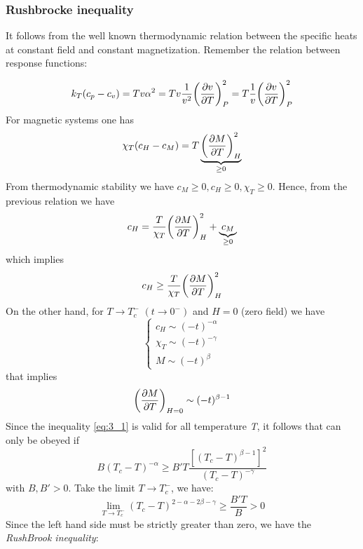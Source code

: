 \documentclass[../main/main.tex]{subfiles}
\begin{document}
\subsubsection{Rushbrocke inequality}
It follows from the well known thermodynamic relation between the specific heats at constant field and constant magnetization.
Remember the relation between response functions:

\begin{equation*}
   k_T (c_p-c_v)=T v \alpha ^2 = T v \frac{1}{v^2} \qty(\pdv{v}{T} )^2_P = T \frac{1}{v} \qty(\pdv{v}{T} )^2_P
\end{equation*}
For magnetic systems one has
\begin{equation*}
  \chi _T (c_H-c_M) = T \underbrace{ \qty(\pdv{M}{T} )^2_H }_{\geq 0}
\end{equation*}
From thermodynamic stability we have \( c_M \geq 0, c_H \geq 0, \chi _T \geq 0  \).
Hence, from the previous relation we have
\begin{equation*}
   c_H = \frac{T}{\chi _T} \qty(\pdv{M}{T} )^2_H + \underbrace{c_M}_{\ge0}
\end{equation*}
which implies
\begin{equation}
   c_H \ge \frac{T}{\chi _T} \qty(\pdv{M}{T} )^2_H 
   \label{eq:3_1}
\end{equation}
On the other hand, for \( T \rightarrow T_c^- \) \( (t \rightarrow 0^-) \) and \( H=0 \) (zero field) we have
\begin{equation*}
  \begin{cases}
   c_H \sim (-t)^{-\alpha }\\
   \chi _T \sim (-t)^{-\gamma  } \\
    M \sim (-t)^{\beta }
  \end{cases}
\end{equation*}
that implies
\begin{equation*}
 \qty( \pdv{M}{T})_{H=0} \sim (-t)^{\beta -1}    
\end{equation*}
Since the inequality \eqref{eq:3_1} is valid for all temperature \emph{T}, it follows that can only be obeyed if
\begin{equation*}
  B (T_c - T)^{-\alpha } \ge B' T \frac{[(T_c - T)^{\beta -1}]^2}{(T_c-T)^{-\gamma  }}
\end{equation*}
with \( B,B' > 0 \). Take the limit \( T \rightarrow T_c^- \), we have:
\begin{equation*}
  \lim_{T \rightarrow T_c^-} (T_c - T)^{2- \alpha - 2 \beta - \gamma  } \ge \frac{B' T}{B} > 0
\end{equation*}
Since the left hand side must be strictly greater than zero, we have the \textit{RushBrook inequality}:
\end{document}
